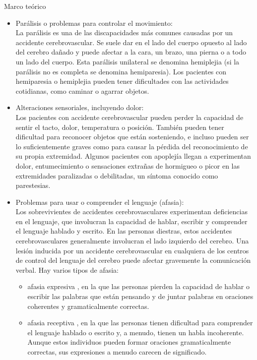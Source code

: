 \begin{thesischapter}{1} {Marco teórico}
    \begin{itemize}
        \item Parálisis o problemas para controlar el movimiento: \\
        La parálisis es una de las discapacidades más comunes causadas por un accidente
        cerebrovascular. Se suele dar en el lado del cuerpo opuesto al lado del cerebro dañado y
        puede afectar a la cara, un brazo, una pierna o a todo un lado del cuerpo. Esta parálisis
        unilateral se denomina hemiplejia (si la parálisis no es completa se denomina
        hemiparesia). Los pacientes con hemiparesia o hemiplejia pueden tener dificultades con
        las actividades cotidianas, como caminar o agarrar objetos.~\cite{cuidadosalpacienteadulto}
        \item Alteraciones sensoriales, incluyendo dolor:\\
        Los pacientes con accidente cerebrovascular pueden perder la capacidad de sentir
        el tacto, dolor, temperatura o posición. También pueden tener dificultad para reconocer
        objetos que están sosteniendo, e incluso pueden ser lo suficientemente graves como para
        causar la pérdida del reconocimiento de su propia extremidad. Algunos pacientes con
        apoplejía llegan a experimentan dolor, entumecimiento o sensaciones extrañas de
        hormigueo o picor en las extremidades paralizadas o debilitadas, un síntoma conocido
        como parestesias.~\cite{post-strok}
        \item Problemas para usar o comprender el lenguaje (afasia):\\
        Los sobrevivientes de accidentes cerebrovasculares experimentan deficiencias en el lenguaje, 
        que involucran la capacidad de hablar, escribir y comprender el lenguaje hablado y escrito. 
        En las personas diestras, estos accidentes cerebrovasculares generalmente involucran el lado 
        izquierdo del cerebro. Una lesión inducida por un accidente cerebrovascular en cualquiera de 
        los centros de control del lenguaje del cerebro puede afectar gravemente la comunicación verbal. 
        Hay varios tipos de afasia:~\cite{post-strok}
        \begin{itemize}
            \item afasia expresiva , en la que las personas pierden la capacidad de hablar o escribir las palabras que están pensando y de juntar palabras en oraciones coherentes y gramaticalmente correctas.
            \item afasia receptiva , en la que las personas tienen dificultad para comprender el lenguaje hablado o escrito y, a menudo, tienen un habla incoherente. Aunque estos individuos pueden formar oraciones gramaticalmente correctas, sus expresiones a menudo carecen de significado.

\end{itemize}
\end{itemize}
\end{thesischapter}
